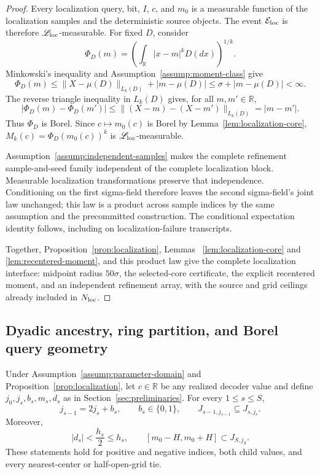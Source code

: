 \begin{proof}
Every localization query, bit, $I$, $c$, and $m_0$ is a measurable function
of the localization samples and the deterministic source objects.  The event
$\mathcal E_{\rm loc}$ is therefore $\mathscr L_{\rm loc}$-measurable.
For fixed $D$, consider
\[
 \Phi_D(m)=\left(\int_{\mathbb R}|x-m|^kD(dx)\right)^{1/k}.
\]
Minkowski's inequality and Assumption~\ref{assump:moment-class} give
\[
 \Phi_D(m)\leq\|X-\mu(D)\|_{L_k(D)}+|m-\mu(D)|
 \leq\sigma+|m-\mu(D)|<\infty.
\]
The reverse triangle inequality in $L_k(D)$ gives, for all $m,m'\in\mathbb R$,
\[
 |\Phi_D(m)-\Phi_D(m')|
 \leq\|(X-m)-(X-m')\|_{L_k(D)}=|m-m'|.
\]
Thus $\Phi_D$ is Borel.  Since $c\mapsto m_0(c)$ is Borel by
Lemma~\ref{lem:localization-core},
$M_k(c)=\Phi_D(m_0(c))^k$ is $\mathscr L_{\rm loc}$-measurable.

Assumption~\ref{assump:independent-samples} makes the complete refinement
sample-and-seed family independent of the complete localization block.
Measurable localization transformations preserve that independence.
Conditioning on the first sigma-field therefore leaves the second sigma-field's
joint law unchanged; this law is a product across sample indices by the same
assumption and the precommitted construction.  The conditional expectation
identity follows, including on localization-failure transcripts.

Together, Proposition~\ref{prop:localization}, Lemmas~
\ref{lem:localization-core} and \ref{lem:recentered-moment}, and this product
law give the complete localization interface: midpoint radius $50\sigma$,
the selected-core certificate, the explicit recentered moment, and an
independent refinement array, with the source and grid ceilings already
included in $N_{\rm loc}$.
\end{proof}
\subsection{Dyadic ancestry, ring partition, and Borel query geometry}

\begin{lemma}
\label{lem:dyadic-ancestor}
Under Assumption~\ref{assump:parameter-domain} and
Proposition~\ref{prop:localization}, let $c\in\mathbb R$ be any realized
decoder value and define $j_0,j_s,b_s,m_s,d_s$ as in
Section~\ref{sec:preliminaries}.  For every $1\leq s\leq S$,
\[
 j_{s-1}=2j_s+b_s,\qquad b_s\in\{0,1\},\qquad
 J_{s-1,j_{s-1}}\subseteq J_{s,j_s}.
\]
Moreover,
\[
 |d_s|<\frac{h_s}{2}\leq h_s,\qquad
 [m_0-H,m_0+H]\subset J_{S,j_S}.
\]
These statements hold for positive and negative indices, both child values,
and every nearest-center or half-open-grid tie.
\end{lemma}

